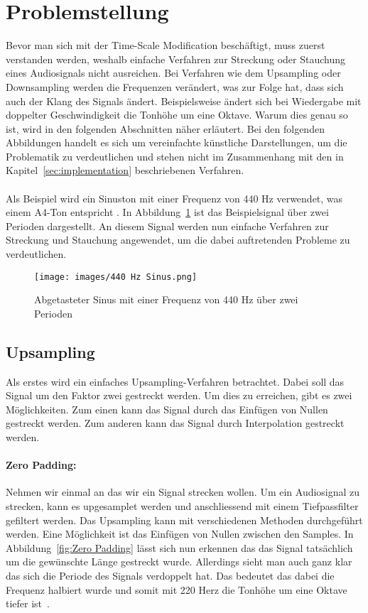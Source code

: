 \section{Problemstellung}
\label{sec:problemstellung}
Bevor man sich mit der Time-Scale Modification beschäftigt, muss zuerst verstanden werden, weshalb einfache Verfahren zur Streckung oder Stauchung eines Audiosignals nicht ausreichen. Bei Verfahren wie dem Upsampling oder Downsampling werden die Frequenzen verändert, was zur Folge hat, dass sich auch der Klang des Signals ändert. Beispielsweise ändert sich bei Wiedergabe mit doppelter Geschwindigkeit die Tonhöhe um eine Oktave. Warum dies genau so ist, wird in den folgenden Abschnitten näher erläutert. Bei den folgenden Abbildungen handelt es sich um vereinfachte künstliche Darstellungen, um die Problematik zu verdeutlichen und stehen nicht im Zusammenhang mit den in Kapitel~\ref{sec:implementation} beschriebenen Verfahren.

\paragraph{}
Als Beispiel wird ein Sinuston mit einer Frequenz von 440 Hz verwendet, was einem A4-Ton entspricht \cite{Lazzarini2019ComputerMI}. In Abbildung~\ref{fig:440 Hz Sinus} ist das Beispielsignal über zwei Perioden dargestellt. An diesem Signal werden nun einfache Verfahren zur Streckung und Stauchung angewendet, um die dabei auftretenden Probleme zu verdeutlichen.

\begin{figure}[h]
    \centering
    \texttt{[image: images/440 Hz Sinus.png]}
    \caption{Abgetasteter Sinus mit einer Frequenz von 440 Hz über zwei Perioden}
    \label{fig:440 Hz Sinus}
\end{figure}

\subsection{Upsampling}
Als erstes wird ein einfaches Upsampling-Verfahren betrachtet. Dabei soll das Signal um den Faktor zwei gestreckt werden. Um dies zu erreichen, gibt es zwei Möglichkeiten. Zum einen kann das Signal durch das Einfügen von Nullen gestreckt werden. Zum anderen kann das Signal durch Interpolation gestreckt werden.

\paragraph{Zero Padding:}
Nehmen wir einmal an das wir ein Signal strecken wollen. Um ein Audiosignal zu strecken, kann es upgesamplet werden und anschliessend mit einem Tiefpassfilter gefiltert werden. Das Upsampling kann mit verschiedenen Methoden durchgeführt werden. Eine Möglichkeit ist das Einfügen von Nullen zwischen den Samples. In Abbildung~\ref{fig:Zero Padding} lässt sich nun erkennen das das Signal tatsächlich um die gewünschte Länge gestreckt wurde.
Allerdings sieht man auch ganz klar das sich die Periode des Signals verdoppelt hat. Das bedeutet das dabei die Frequenz halbiert wurde und somit mit 220 Herz die Tonhöhe um eine Oktave tiefer ist~\cite{Bosi2004IntroductionTD}.


